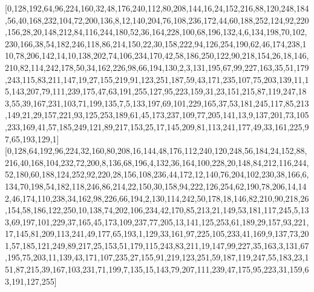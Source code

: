 [0,128,192,64,96,224,160,32,48,176,240,112,80,208,144,16,24,152,216,88,120,248,184,56,40,168,232,104,72,200,136,8,12,140,204,76,108,236,172,44,60,188,252,124,92,220,156,28,20,148,212,84,116,244,180,52,36,164,228,100,68,196,132,4,6,134,198,70,102,230,166,38,54,182,246,118,86,214,150,22,30,158,222,94,126,254,190,62,46,174,238,110,78,206,142,14,10,138,202,74,106,234,170,42,58,186,250,122,90,218,154,26,18,146,210,82,114,242,178,50,34,162,226,98,66,194,130,2,3,131,195,67,99,227,163,35,51,179,243,115,83,211,147,19,27,155,219,91,123,251,187,59,43,171,235,107,75,203,139,11,15,143,207,79,111,239,175,47,63,191,255,127,95,223,159,31,23,151,215,87,119,247,183,55,39,167,231,103,71,199,135,7,5,133,197,69,101,229,165,37,53,181,245,117,85,213,149,21,29,157,221,93,125,253,189,61,45,173,237,109,77,205,141,13,9,137,201,73,105,233,169,41,57,185,249,121,89,217,153,25,17,145,209,81,113,241,177,49,33,161,225,97,65,193,129,1]
[0,128,64,192,96,224,32,160,80,208,16,144,48,176,112,240,120,248,56,184,24,152,88,216,40,168,104,232,72,200,8,136,68,196,4,132,36,164,100,228,20,148,84,212,116,244,52,180,60,188,124,252,92,220,28,156,108,236,44,172,12,140,76,204,102,230,38,166,6,134,70,198,54,182,118,246,86,214,22,150,30,158,94,222,126,254,62,190,78,206,14,142,46,174,110,238,34,162,98,226,66,194,2,130,114,242,50,178,18,146,82,210,90,218,26,154,58,186,122,250,10,138,74,202,106,234,42,170,85,213,21,149,53,181,117,245,5,133,69,197,101,229,37,165,45,173,109,237,77,205,13,141,125,253,61,189,29,157,93,221,17,145,81,209,113,241,49,177,65,193,1,129,33,161,97,225,105,233,41,169,9,137,73,201,57,185,121,249,89,217,25,153,51,179,115,243,83,211,19,147,99,227,35,163,3,131,67,195,75,203,11,139,43,171,107,235,27,155,91,219,123,251,59,187,119,247,55,183,23,151,87,215,39,167,103,231,71,199,7,135,15,143,79,207,111,239,47,175,95,223,31,159,63,191,127,255]